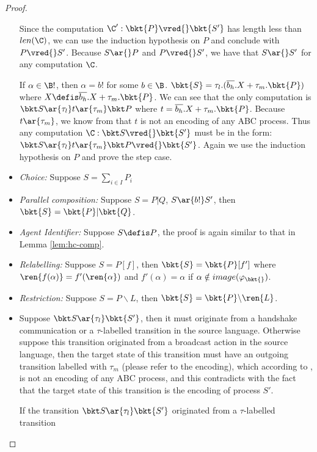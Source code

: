 \begin{proof}
\begin{itemize}
\begin{itemize}
    \end{itemize}

    Since the computation $\C': \bkt{P}\vred{}\bkt{S'}$ has length less than $len(\C)$, we can use the induction hypothesis on $P$ and conclude with $P\vred{}S'$.
    Because $S\ar{}P$ and $P\vred{}S'$, we have that $S\ar{}S'$ for any computation $\C$.

    If $\alpha \in \B!$, then $\alpha = b!$ for some $b\in \B$.
    $\bkt{S} = \tau_l.(\overline{b_h}.X + \tau_m.\bkt{P})$ where $X\defis\overline{b_h}.X + \tau_m.\bkt{P}$.
    We can see that the only computation is $\bkt S \ar{\tau_l} t \ar{\tau_m} \bkt P$ where $t=\overline{b_h}.X + \tau_m.\bkt{P}$.
    Because $t\ar{\tau_m}$, we know from  that $t$ is not an encoding of any ABC process.
    Thus any computation $\C : \bkt S \vred{} \bkt{S'}$ must be in the form: $\bkt S \ar{\tau_l} t \ar{\tau_m} \bkt P \vred{} \bkt{S'}$.
    Again we use the induction hypothesis on $P$ and prove the step case.

    \item \emph{Choice:} Suppose $S=\sum_{i\in I}P_i$

		\item \emph{Parallel composition:} Suppose $S = P | Q$, $S \ar{b!} S'$, then $\bkt{S} = \bkt{P}| \bkt{Q}$.

    \item \emph{Agent Identifier:} Suppose $S\defis P$, the proof is again similar to that in Lemma \ref{lem:hc-comp}.

    \item \emph{Relabelling:} Suppose $S = P[f]$, then $\bkt{S} = \bkt{P}[f']$ where $\ren{f(\alpha)}=f'(\ren{\alpha})$ and $f'(\alpha) = \alpha$ if $\alpha \notin image(\varphi_{\bkt{}})$.

    \item \emph{Restriction:} Suppose $S=P\backslash L$, then $\bkt{S} = \bkt{P}\backslash \ren{L}$.


  \end{itemize}









    \begin{itemize}
      \item Suppose $\bkt S \ar{\tau_l} \bkt{S'}$, then it must originate from a handshake communication or a $\tau$-labelled transition in the source language.
      Otherwise suppose this transition originated from a broadcast action in the source language, then the target state of this transition must have an outgoing transition labelled with $\tau_m$ (please refer to the encoding), which according to , is not an encoding of any ABC process, and this contradicts with the fact that the target state of this transition is the encoding of process $S'$.

      If the transition $\bkt S \ar{\tau_l} \bkt{S'}$ originated from a $\tau$-labelled transition
    \end{itemize}
  \end{proof}





